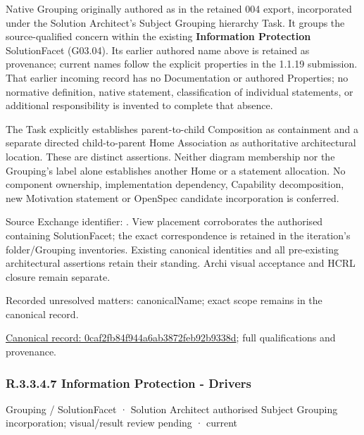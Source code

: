 Native Grouping originally authored as \texttt{} in the retained 004 export,
incorporated under the Solution Architect's Subject Grouping hierarchy Task.
It groups the source-qualified \texttt{} concern within
the existing \textbf{Information Protection} SolutionFacet (G03.04). Its earlier authored name above is retained as provenance; current names
follow the explicit properties in the 1.1.19 submission.
That earlier incoming record has no Documentation or authored Properties; no normative
definition, native statement, classification of individual statements, or
additional responsibility is invented to complete that absence.



The Task explicitly establishes parent-to-child Composition as containment and
a separate directed child-to-parent Home Association as authoritative architectural
location. These are distinct assertions. Neither diagram membership nor the
Grouping's label alone establishes another Home or a statement allocation.
No component ownership, implementation dependency, Capability decomposition,
new Motivation statement or OpenSpec candidate incorporation is conferred.



Source Exchange identifier: \texttt{}. View placement corroborates
the authorised containing SolutionFacet; the exact correspondence is retained in the
iteration's folder/Grouping inventories. Existing canonical identities and all
pre-existing architectural assertions retain their standing. Archi visual
acceptance and HCRL closure remain separate.


{\small Recorded unresolved matters: canonicalName; exact scope remains in the canonical record.}\par
{\footnotesize \href{../../../../../../../continuum/grouping/0caf2fb84f944a6ab3872feb92b9338d.md}{Canonical record: 0caf2fb84f944a6ab3872feb92b9338d}; full qualifications and provenance.}\par
\subsubsection*{R.3.3.4.7 Information Protection - Drivers}
\label{navigation:R.3.3.4.7}

\label{element:ce45a338a1fc4d11a8d64ce898119f94}
{\small Grouping / SolutionFacet · Solution Architect authorised Subject Grouping incorporation; visual/result review pending · current}\par

